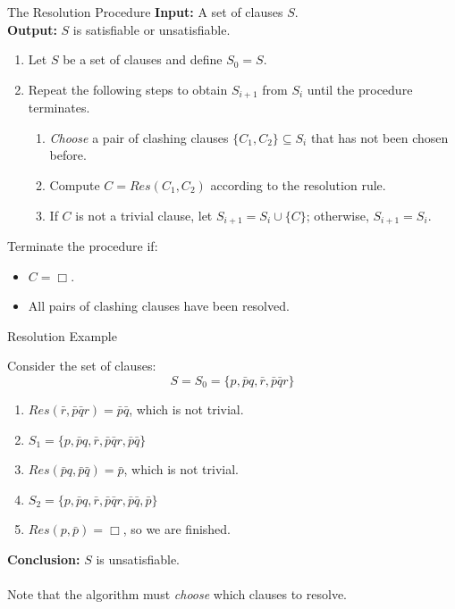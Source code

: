 \documentclass[style=sailor,size=12pt]{powerdot}
\begin{document}
\begin{wideslide}[bm=,toc=]{The Resolution Procedure}
{ \bf Input:} A set of clauses $S$.\\
{ \bf Output:} $S$ is satisfiable or unsatisfiable.\\
\begin{enumerate}
\item Let $S$ be a set of clauses and define $S_0 = S$.
\item Repeat the following steps to obtain $S_{i+1}$ from $S_i$ until
the procedure terminates.
\begin{enumerate}
\item \emph{Choose} a pair of clashing clauses $\{C_1,C_2\} \subseteq S_i$ that
has not been chosen before.
\item Compute $C = Res(C_1,C_2)$ according to the resolution rule.
\item If $C$ is not a trivial clause, let $S_{i + 1} = S_i \cup \{C\}$;
otherwise, $S_{i+1} = S_i$.
\end{enumerate}
\end{enumerate}
Terminate the procedure if:
\begin{itemize}
\item $C = \Box$.
\item All pairs of clashing clauses have been resolved. 
\end{itemize}

\end{wideslide}

\begin{wideslide}[bm=,toc=]{Resolution Example}
\begin{ex}{4.19}
Consider the set of clauses:
\[
  S  = S_0 = \{p,\bar{p}q,\bar{r},\bar{p}\bar{q}r\}
  \]
\end{ex}
\begin{enumerate}
\item $Res(\bar{r},\bar{p}\bar{q}r) = \bar{p}\bar{q}$, which is not trivial.
\item $S_1  = \{p,\bar{p}q,\bar{r},\bar{p}\bar{q}r, \bar{p}\bar{q}\}$
\item $Res(\bar{p}q,\bar{p}\bar{q}) = \bar{p}$, which is not trivial.
\item $S_2  = \{p,\bar{p}q,\bar{r},\bar{p}\bar{q}r, \bar{p}\bar{q}, \bar{p}\}$
\item $Res(p,\bar{p}) = \Box $, so we are finished.
\end{enumerate}
{\bf Conclusion:} $S$ is unsatisfiable.\\
~\\
Note that the algorithm must \emph{choose} which clauses to resolve.
\end{wideslide}
\end{document}
